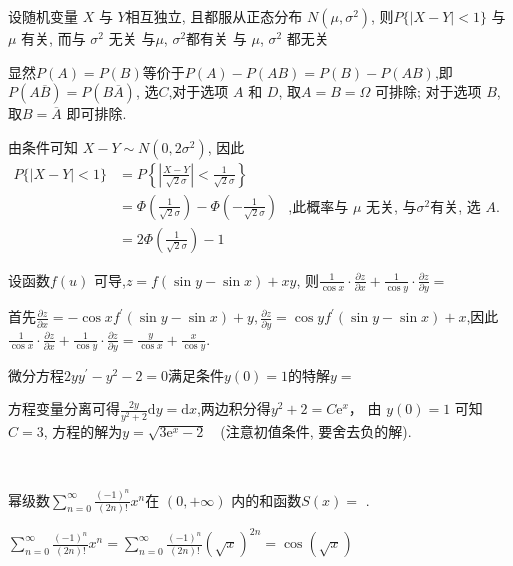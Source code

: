 \documentclass[kindlepaper]{BHCexam4kindle}
\begin{document}
\begin{questions}
		\qs 设随机变量 $X$ 与 $Y$相互独立, 且都服从正态分布 $N\left(\mu, \sigma^{2}\right)$, 则$P\{|X-Y|<1\}$\xx
		{与$\mu$ 有关, 而与 $\sigma^{2}$ 无关}
		{与$\mu$, $\sigma^{2}$都有关}
		{与 $\mu$, $\sigma^{2}$ 都无关}
		\begin{solution}
			显然$P(A)=P(B)$等价于$P(A)-P(A B)=P(B)-P(A B)$,即$P(A \overline{B})=P(B \overline{A})$,
			选$C$,对于选项 $A$ 和 $D$, 取$A=B=\Omega$ 可排除; 对于选项 $B$, 取$B=\overline{A}$ 即可排除.
		\end{solution}

		\qs 由条件可知 $X-Y \sim N\left(0,2 \sigma^{2}\right)$, 因此\\
	$\begin{aligned} P\{|X-Y|<1\} &=P\left\{\left|\frac{X-Y}{\sqrt{2} \sigma}\right|<\frac{1}{\sqrt{2} \sigma}\right\} 
	\\ &=\Phi\left(\frac{1}{\sqrt{2} \sigma}\right)-\Phi\left(-\frac{1}{\sqrt{2} \sigma}\right)
	\\ &=2 \Phi\left(\frac{1}{\sqrt{2} \sigma}\right)-1 \end{aligned}$
		,此概率与 $\mu$ 无关, 与$\sigma^{2}$有关, 选 $A$.

		\qs 设函数$f(u)$ 可导,$z=f(\sin y-\sin x)+x y$, 则$\frac{1}{\cos x} \cdot \frac{\partial z}{\partial x}+\frac{1}{\cos y} \cdot \frac{\partial z}{\partial y}=$ \tk
		\begin{solution}
			首先$\frac{\partial z}{\partial x}=-\cos x f^{\prime}(\sin y-\sin x)+y, \frac{\partial z}{\partial y}=\cos y f^{\prime}(\sin y-\sin x)+x$,因此
			$\frac{1}{\cos x} \cdot \frac{\partial z}{\partial x}+\frac{1}{\cos y} \cdot \frac{\partial z}{\partial y}=\frac{y}{\cos x}+\frac{x}{\cos y}$.
		\end{solution}

		\qs 微分方程$2 y y^{\prime}-y^{2}-2=0$满足条件$y(0)=1$的特解$y=$\tk
		\begin{solution}
			方程变量分离可得$\frac{2 y}{y^{2}+2} \mathrm{d} y=\mathrm{d} x$,两边积分得$y^{2}+2=C \mathrm{e}^{x}$，
			由 $y(0)=1$ 可知$C=3$, 方程的解为$y=\sqrt{3 \mathrm{e}^{x}-2}$　(注意初值条件, 要舍去负的解).
		\end{solution}　

		\qs 幂级数$\sum_{n=0}^{\infty} \frac{(-1)^{n}}{(2 n) !} x^{n}$在 $(0,+\infty)$ 内的和函数$S(x)=$ \tk.
		\begin{solution}
			$\sum_{n=0}^{\infty} \frac{(-1)^{n}}{(2 n) !} x^{n}=\sum_{n=0}^{\infty} \frac{(-1)^{n}}{(2 n) !}(\sqrt{x})^{2 n}=\cos (\sqrt{x})$
		\end{solution}


\end{questions}
\end{document}
